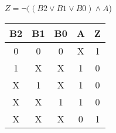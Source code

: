 
\begin{center}
    {\(Z = \lnot ((B2 \lor B1 \lor B0) \land A \))}
    \begin{table}[h] %
        \begin{center}
            \begin{tabular}{|c|c|c|c||c|} \hline
            B2 & B1 & B0 & A & Z \\ \hline\hline
            0  & 0  & 0  & X & 1 \\ \hline
            1  & X  & X  & 1 & 0 \\ \hline
            X  & 1  & X  & 1 & 0 \\ \hline
            X  & X  & 1  & 1 & 0 \\ \hline
            X  & X  & X  & 0 & 1 \\ \hline
            \end{tabular}
        \end{center}
    \end{table}
\end{center}
